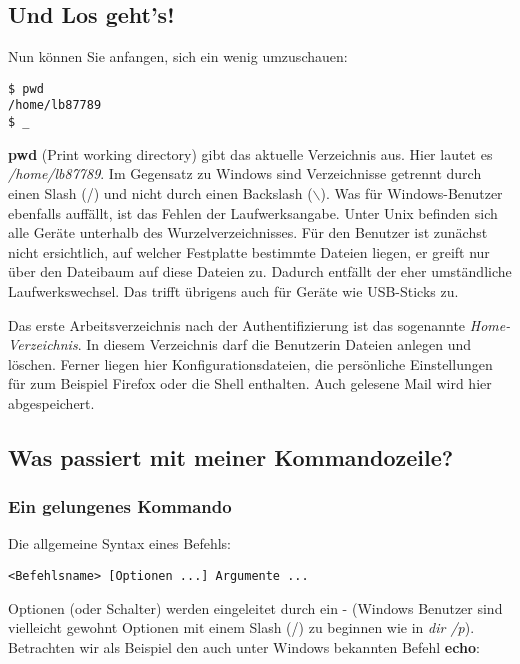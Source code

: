 \documentclass[titlepage,a4paper]{article}
\begin{document}
\subsection{Und Los geht's!}
\label{sec:begin}

Nun können Sie anfangen, sich ein wenig umzuschauen:

\begin{verbatim}
$ pwd
/home/lb87789
$ _
\end{verbatim}

\textbf{pwd} (Print working directory) gibt das aktuelle Verzeichnis aus.
Hier lautet es \emph{/home/lb87789}.  Im Gegensatz zu Windows sind Verzeichnisse
getrennt durch einen Slash (/) und nicht durch einen Backslash
($\backslash$).  Was für Windows-Benutzer ebenfalls auffällt, ist das Fehlen der
Laufwerksangabe.  Unter Unix befinden sich alle Geräte unterhalb des
Wurzelverzeichnisses.  Für den Benutzer ist zunächst nicht ersichtlich, auf
welcher Festplatte bestimmte Dateien liegen, er greift nur über den Dateibaum
auf diese Dateien zu.  Dadurch entfällt der eher umständliche
Laufwerkswechsel.  Das trifft übrigens auch für Geräte wie USB-Sticks zu.

Das erste Arbeitsverzeichnis nach der Authentifizierung ist das sogenannte
\emph{Home-Verzeichnis}.  In diesem Verzeichnis darf die Benutzerin Dateien
anlegen und löschen.  Ferner liegen hier Konfigurationsdateien, die
persönliche Einstellungen für zum Beispiel Firefox oder die Shell enthalten.
Auch gelesene Mail wird hier abgespeichert.

\subsection{Was passiert mit meiner Kommandozeile?}
\label{sec:commandline}

\subsubsection*{Ein gelungenes Kommando}

Die allgemeine Syntax eines Befehls:

\begin{verbatim}
<Befehlsname> [Optionen ...] Argumente ...
\end{verbatim}

Optionen (oder Schalter) werden eingeleitet durch ein - (Windows Benutzer sind
vielleicht gewohnt Optionen mit einem Slash (/) zu beginnen wie in \emph{dir
  /p}).  Betrachten wir als Beispiel den auch unter Windows bekannten Befehl
\textbf{echo}: 
\end{document}
